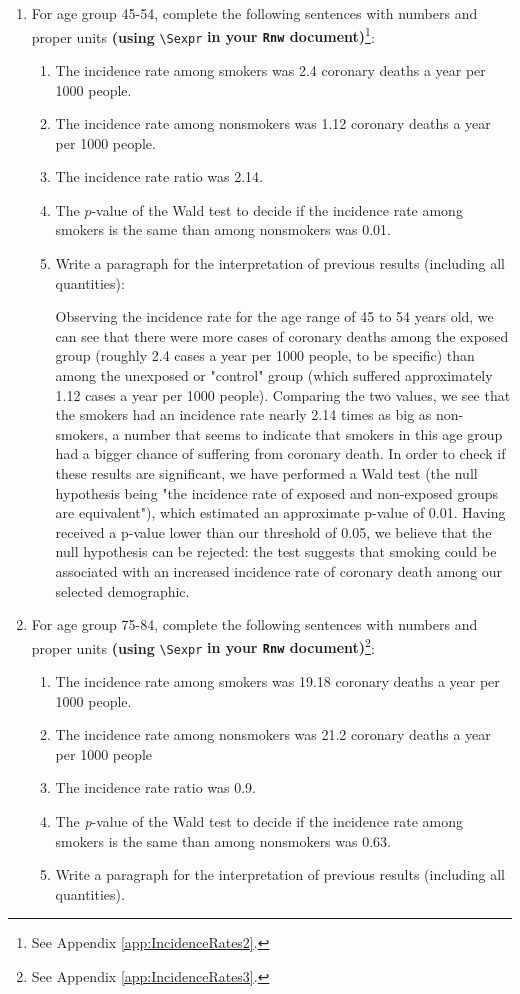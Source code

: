 \documentclass[10pt,a4paper,twoside]{article}\usepackage[]{graphicx}\usepackage[]{xcolor}
\newcommand{\Robject}[1]{\texttt{#1}}
\begin{document}
\begin{enumerate}
  
  \item For age group 45-54, complete the following sentences with numbers and proper units \textbf{(using} \verb+\Sexpr+ \textbf{in your \Robject{Rnw} document)}\footnote{See Appendix \ref{app:IncidenceRates2}.}:

  \begin{enumerate}
    \item The incidence rate among smokers was 2.4 coronary deaths a year per 1000 people.
    \item The incidence rate among nonsmokers was 1.12 coronary deaths a year per 1000 people.
    \item The incidence rate ratio was 2.14.
    \item The $p$-value of the Wald test to decide if the incidence rate among smokers is the same than among nonsmokers was 0.01.
    \item Write a paragraph for the interpretation of previous results (including all quantities):

      Observing the incidence rate for the age range of 45 to 54 years old, we can see that there were more cases of coronary deaths among the exposed group (roughly 2.4 cases a year per 1000 people, to be specific) than among the unexposed or "control" group (which suffered approximately 1.12 cases a year per 1000 people). Comparing the two values, we see that the smokers had an incidence rate nearly 2.14 times as big as non-smokers, a number that seems to indicate that smokers in this age group had a bigger chance of suffering from coronary death. In order to check if these results are significant, we have performed a Wald test (the null hypothesis being "the incidence rate of exposed and non-exposed groups are equivalent"), which estimated an approximate p-value of 0.01. Having received a p-value lower than our threshold of 0.05, we believe that the null hypothesis can be rejected: the test suggests that smoking could be associated with an increased incidence rate of coronary death among our selected demographic.

  \end{enumerate}
  \item For age group 75-84, complete the following sentences with numbers and proper units \textbf{(using} \verb+\Sexpr+ \textbf{in your \Robject{Rnw} document)}\footnote{See Appendix \ref{app:IncidenceRates3}.}:

  \begin{enumerate}
    \item The incidence rate among smokers was 19.18 coronary deaths a year per 1000 people.
    \item The incidence rate among nonsmokers was 21.2 coronary deaths a year per 1000 people
    \item The incidence rate ratio was 0.9.
    \item The \textit{p}-value of the Wald test to decide if the incidence rate among smokers is the same than among nonsmokers was 0.63.
    \item Write a paragraph for the interpretation of previous results (including all quantities).


\end{enumerate}
\end{enumerate}
\end{document}
